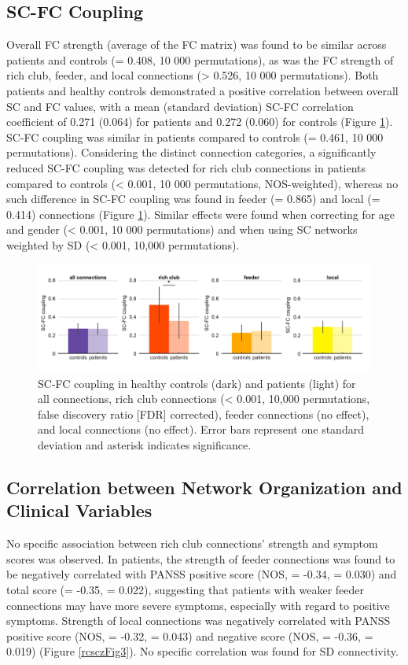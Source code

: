\begin{refsection}
\subsection*{SC-FC Coupling}
Overall FC strength (average of the FC matrix) was found to be similar across patients and controls (\pval = 0.408, 10 000 permutations), as was the FC strength of rich club, feeder, and local connections (\pval > 0.526, 10 000 permutations). Both patients and healthy controls demonstrated a positive correlation between overall SC and FC values, with a mean (standard deviation) SC-FC correlation coefficient of 0.271 (0.064) for patients and 0.272 (0.060) for controls (Figure \ref{rcsczFig2}). SC-FC coupling was similar in patients compared to controls (\pval = 0.461, 10 000 permutations). Considering the distinct connection categories, a significantly reduced SC-FC coupling was detected for rich club connections in patients compared to controls (\pval < 0.001, 10 000 permutations, NOS-weighted), whereas no such difference in SC-FC coupling was found in feeder (\pval = 0.865) and local (\pval = 0.414) connections (Figure \ref{rcsczFig2}). Similar effects were found when correcting for age and gender (\pval < 0.001, 10 000 permutations) and when using SC networks weighted by SD (\pval < 0.001, 10,000 permutations).

\begin{figure}[h]
\centering
  \includegraphics[width=\linewidth]{images/rcsczFig2.jpg}
  \caption{\small SC-FC coupling in healthy controls (dark) and patients (light) for all connections, rich club connections (\pval < 0.001, 10,000 permutations, false discovery ratio [FDR] corrected), feeder connections (no effect), and local connections (no effect). Error bars represent one standard deviation and asterisk indicates significance.}
  \label{rcsczFig2}
\end{figure}

\subsection*{Correlation between Network Organization and Clinical Variables}
No specific association between rich club connections' strength and symptom scores was observed. In patients, the strength of feeder connections was found to be negatively correlated with PANSS positive score (NOS, \rval = -0.34, \pval = 0.030) and total score (\rval = -0.35, \pval = 0.022), suggesting that patients with weaker feeder connections may have more severe symptoms, especially with regard to positive symptoms. Strength of local connections was negatively correlated with PANSS positive score (NOS, \rval = -0.32, \pval = 0.043) and negative score (NOS, \rval = -0.36, \pval = 0.019) (Figure \ref{rcsczFig3}). No specific correlation was found for SD connectivity.


\end{refsection}
